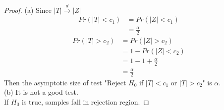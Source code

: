 \documentclass[12pt]{article}
\begin{document}
\begin{proof}
(a)
Since $|T|\xrightarrow{d}|Z|$
\begin{align*}
Pr(|T|<c_1)&=Pr(|Z|<c_1)\\
&=\frac{\alpha}{2}
\end{align*}
\begin{align*}
Pr(|T|>c_2)&=Pr(|Z|>c_2)\\
&=1-Pr(|Z|<c_2)\\
&=1-1+\frac{\alpha}{2}\\
&=\frac{\alpha}{2}
\end{align*}
Then the asymptotic size of test "Reject $H_0$ if $|T| < c_1$ or $|T|>c_2$" is $\alpha$.\\
(b) It is not a good test.\\
If $H_0$ is true, samples fall in rejection region.
\end{proof}
\end{document}
